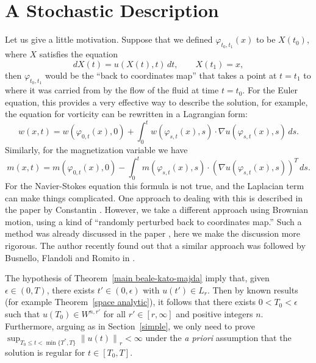 \documentclass[12pt]{amsart}
\theoremstyle{remark}
\newcommand{\snormo}[1]{{\mathopen\|#1\mathclose\|}}
\begin{document}
\section{A Stochastic Description}

Let us give a little motivation.  Suppose that 
we defined $\varphi_{t_0,t_1}(x)$
to be $X(t_0)$, where $X$ satisfies
the equation
$$ dX(t) = u(X(t),t) \, dt,
   \qquad
   X(t_1) = x ,$$
then $\varphi_{t_0,t_1}$ would be the ``back to coordinates map'' that
takes a point at $t=t_1$ to where it was carried from by the flow of the
fluid at time $t=t_0$.  For the Euler equation, this provides a very effective
way to describe the solution, for example, the
equation for vorticity can be rewritten in a Lagrangian form:
$$ w(x,t) = w(\varphi_{0,t}(x),0)
   + \int_0^t w(\varphi_{s,t}(x),s) \cdot \nabla u(\varphi_{s,t}(x),s) \, ds .$$
Similarly, for the magnetization variable we have
$$ m(x,t) = m(\varphi_{0,t}(x),0)
   - \int_0^t m(\varphi_{s,t}(x),s) \cdot 
   (\nabla u(\varphi_{s,t}(x),s))^T \, ds .$$
For the Navier-Stokes equation this formula is not true, and the Laplacian term
can make things complicated.  One approach to dealing with this is described
in the paper by Constantin \cite{constantin}.  
However, we take a different approach using Brownian motion, using a
kind of
``randomly perturbed back to coordinates map.''
Such a method was already discussed in the paper
\cite{montgomery-smith-pokorny}, here we make the discussion more rigorous.
The author recently found out that a similar approach was followed by
Busnello, Flandoli and Romito in \cite{busnello et al}.

The hypothesis of Theorem~\ref{main beale-kato-majda} imply that, 
given $\epsilon \in (0,T)$, there exists
$t' \in (0,\epsilon)$ with $u(t') \in  L_r$.
Then by known results (for example Theorem~\ref{space analytic}), 
it follows
that there exists $0 < T_0<\epsilon$ such that 
$u(T_0) \in W^{n,r'}$ for all $r' \in [r,\infty]$ and positive integers $n$.
Furthermore, arguing as in Section~\ref{simple}, we only need to prove 
$\sup_{T_0 \le t < \min\{T^*,T\}} \snormo{u(t)}_r < \infty$
under the \emph{a priori} assumption that
the solution is regular for $t \in [T_0,T]$.
\end{document}
